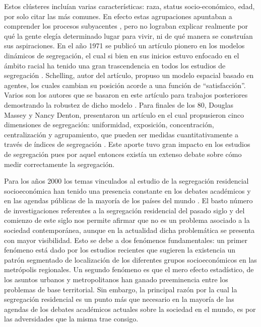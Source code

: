 Estos clústeres incluían varias características: raza, status socio-económico, edad, por solo citar las más comunes. En efecto estas agrupaciones apuntaban a comprender los procesos subyacentes \cite{Ward1975BrianTR} \cite{Downs1977MapsIM}, pero no lograban explicar realmente por qué la gente elegía determinado lugar para vivir, ni de qué manera se construían sus aspiraciones. En el año 1971 se publicó un artículo pionero en los modelos dinámicos de segregación, el cual si bien en sus inicios estuvo enfocado en el ámbito racial ha tenido una gran trascendencia en todos los estudios de segregación \cite{GoffetteNagot2010IntroducingLC}. Schelling, autor del artículo, propuso un modelo espacial basado en agentes, los cuales cambian su posición acorde a una función de “satisfacción”. Varios son los autores que se basaron en este artículo para trabajos posteriores demostrando la robustez de dicho modelo \cite{Ostolaza2001SobreMD} \cite{Banos2012NetworkEI}. Para finales de los 80, Douglas Massey y Nancy Denton, presentaron un artículo en el cual propusieron cinco dimensiones de segregación: uniformidad, exposición, concentración, centralización y agrupamiento, que pueden ser medidas cuantitativamente a través de índices de segregación \cite{Massey1988TheDO}. Este aporte tuvo gran impacto en los estudios de segregación pues por aquel entonces existía un extenso debate sobre cómo medir correctamente la segregación.

Para los años 2000 los temas vinculados al estudio de la segregación residencial socioeconómica han tenido una presencia constante en los debates académicos y en las agendas públicas de la mayoría de los países del mundo \cite{Luco2003SegregacinRE} \cite{Ham2021}. El basto número de investigaciones referentes a la segregación residencial del pasado siglo y del comienzo de este siglo nos permite afirmar que no es un problema asociado a la sociedad contemporánea, aunque en la actualidad dicha problemática se presenta con mayor visibilidad. Esto se debe a dos fenómenos fundamentales: un primer fenómeno está dado por los estudios recientes que sugieren la existencia un patrón segmentado de localización de los diferentes grupos socioeconómicos en las metrópolis regionales. Un segundo fenómeno es que el mero efecto estadístico, de los asuntos urbanos y metropolitanos han ganado preeminencia entre los problemas de base territorial. Sin embargo, la principal razón por la cual la segregación residencial es un punto más que necesario en la mayoría de las agendas de los debates académicos actuales sobre la sociedad en el mundo, es por las adversidades que la misma trae consigo. 

